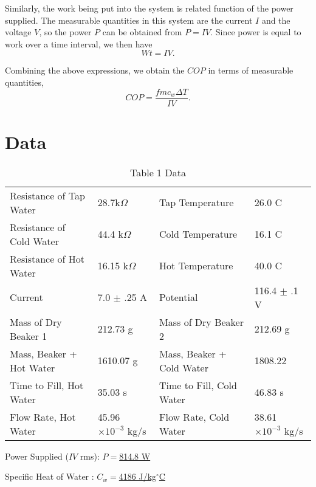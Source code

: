 \documentclass[twocolumn,english]{IEEEtran}
\theoremstyle{plain}
\theoremstyle{plain}
\begin{document}
\begin{enumerate}
	Similarly, the work being put into the system is related function of the power supplied. The measurable quantities in this system are the current $I$ and the voltage $V$, so the power $P$ can be obtained from $P=IV$. Since power is equal to work over a time interval, we then have
	\begin{equation}
		Wt = IV.
	\end{equation}

	Combining the above expressions, we obtain the $COP$ in terms of measurable quantities,
	\begin{equation}\label{eq:cop}
		COP = \frac{fmc_w\Delta T}{IV}.
	\end{equation}
\end{enumerate}

\hrulefill

\section{Data}

\begin{table}[h]
\centering
\caption{Table 1 Data}
\label{tb:data}
\begin{tabular}{@{}llll@{}}
\toprule
Resistance of Tap Water  & 28.7k$\Omega$               & Tap Temperature           & 26.0 C                      \\
Resistance of Cold Water & 44.4 k$\Omega$              & Cold Temperature          & 16.1 C                      \\
Resistance of Hot Water  & 16.15 k$\Omega$             & Hot Temperature           & 40.0 C                      \\
Current                  & 7.0 $\pm$ .25 A             & Potential                 & 116.4 $\pm$ .1 V            \\ \midrule
Mass of Dry Beaker 1     & 212.73 g                    & Mass of Dry Beaker 2      & 212.69 g                    \\
Mass, Beaker + Hot Water & 1610.07 g                   & Mass, Beaker + Cold Water & 1808.22                     \\ \midrule
Time to Fill, Hot Water  & 35.03 s                     & Time to Fill, Cold Water  & 46.83 s                     \\
Flow Rate, Hot Water     & 45.96 $\times 10^{-3}$ kg/s & Flow Rate, Cold Water     & 38.61 $\times 10^{-3}$ kg/s \\ \bottomrule
\end{tabular}
\end{table}
\begin{center}
Power Supplied ($IV$ rms): \underline{$P = $814.8 W}

Specific Heat of Water : \underline{$C_w = $4186 J/kg$^{\circ}$C}
\end{center}
\end{document}

